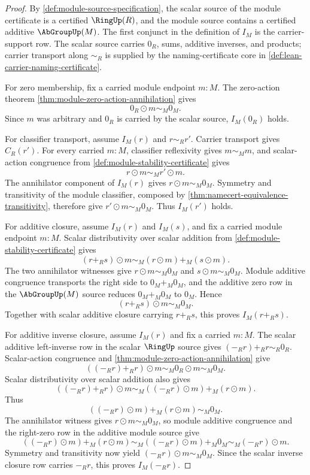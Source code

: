\begin{proof}
By \autoref{def:module-source-specification}, the scalar source of the module certificate is a certified $\RingUp(R)$, and the module source contains a certified additive $\AbGroupUp(M)$. The first conjunct in the definition of $I_M$ is the carrier-support row. The scalar source carries $0_R$, sums, additive inverses, and products; carrier transport along $\sim_R$ is supplied by the naming-certificate core in \autoref{def:lean-carrier-naming-certificate}.

For zero membership, fix a carried module endpoint $m:M$. The zero-action theorem \autoref{thm:module-zero-action-annihilation} gives
$$
0_R\odot m\sim_M0_M.
$$
Since $m$ was arbitrary and $0_R$ is carried by the scalar source, $I_M(0_R)$ holds.

For classifier transport, assume $I_M(r)$ and $r\sim_R r'$. Carrier transport gives $C_R(r')$. For every carried $m:M$, classifier reflexivity gives $m\sim_Mm$, and scalar-action congruence from \autoref{def:module-stability-certificate} gives
$$
r\odot m\sim_M r'\odot m.
$$
The annihilator component of $I_M(r)$ gives $r\odot m\sim_M0_M$. Symmetry and transitivity of the module classifier, composed by \autoref{thm:namecert-equivalence-transitivity}, therefore give $r'\odot m\sim_M0_M$. Thus $I_M(r')$ holds.

For additive closure, assume $I_M(r)$ and $I_M(s)$, and fix a carried module endpoint $m:M$. Scalar distributivity over scalar addition from \autoref{def:module-stability-certificate} gives
$$
(r+_R s)\odot m\sim_M(r\odot m)+_M(s\odot m).
$$
The two annihilator witnesses give $r\odot m\sim_M0_M$ and $s\odot m\sim_M0_M$. Module additive congruence transports the right side to $0_M+_M0_M$, and the additive zero row in the $\AbGroupUp(M)$ source reduces $0_M+_M0_M$ to $0_M$. Hence
$$
(r+_R s)\odot m\sim_M0_M.
$$
Together with scalar additive closure carrying $r+_R s$, this proves $I_M(r+_R s)$.

For additive inverse closure, assume $I_M(r)$ and fix a carried $m:M$. The scalar additive left-inverse row in the scalar $\RingUp$ source gives $(-_R r)+_R r\sim_R0_R$. Scalar-action congruence and \autoref{thm:module-zero-action-annihilation} give
$$
((-_R r)+_R r)\odot m\sim_M0_R\odot m\sim_M0_M.
$$
Scalar distributivity over scalar addition also gives
$$
((-_R r)+_R r)\odot m\sim_M((-_R r)\odot m)+_M(r\odot m).
$$
Thus
$$
((-_R r)\odot m)+_M(r\odot m)\sim_M0_M.
$$
The annihilator witness gives $r\odot m\sim_M0_M$, so module additive congruence and the right-zero row in the additive module source give
$$
((-_R r)\odot m)+_M(r\odot m)\sim_M((-_R r)\odot m)+_M0_M\sim_M(-_R r)\odot m.
$$
Symmetry and transitivity now yield $(-_R r)\odot m\sim_M0_M$. Since the scalar inverse closure row carries $-_R r$, this proves $I_M(-_R r)$.


\end{proof}
